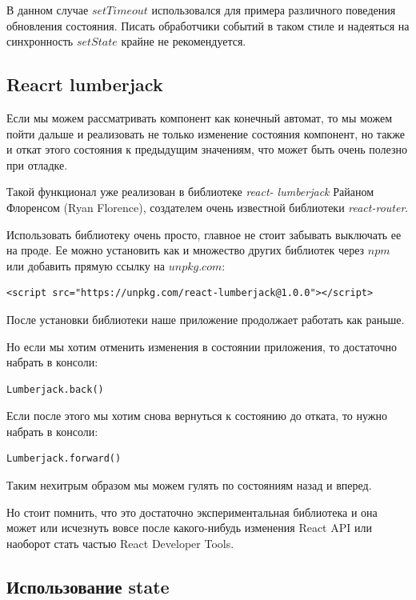 В данном случае $setTimeout$ использовался для примера различного поведения обновления состояния. Писать обработчики событий в таком стиле и надеяться на синхронность $setState$ крайне не рекомендуется.

\subsection*{Reacrt lumberjack}

Если мы можем рассматривать компонент как конечный автомат, то мы можем пойти дальше и реализовать не только изменение состояния компонент, но также и откат этого состояния к предыдущим значениям, что может быть очень полезно при отладке.

Такой функционал уже реализован в библиотеке \textit{react- lumberjack} Райаном Флоренсом (Ryan Florence), создателем очень известной библиотеки \textit{react-router}.

Использовать библиотеку очень просто, главное не стоит забывать выключать ее на проде.
Ее можно установить как и множество других библиотек через $npm$ или добавить прямую ссылку на $unpkg.com$:

\begin{lstlisting}
<script src="https://unpkg.com/react-lumberjack@1.0.0"></script>
\end{lstlisting}

После установки библиотеки наше приложение продолжает работать как раньше. 

Но если мы хотим отменить изменения в состоянии приложения, то достаточно набрать в консоли:

\begin{lstlisting}
Lumberjack.back()
\end{lstlisting}

Если после этого мы хотим снова вернуться к состоянию до отката, то нужно набрать в консоли:

\begin{lstlisting}
Lumberjack.forward()
\end{lstlisting}

Таким нехитрым образом мы можем гулять по состояниям назад и вперед.

Но стоит помнить, что это достаточно экспериментальная библиотека и она может или исчезнуть вовсе после какого-нибудь изменения React API или наоборот стать частью React Developer Tools.

\subsection*{Использование state}

